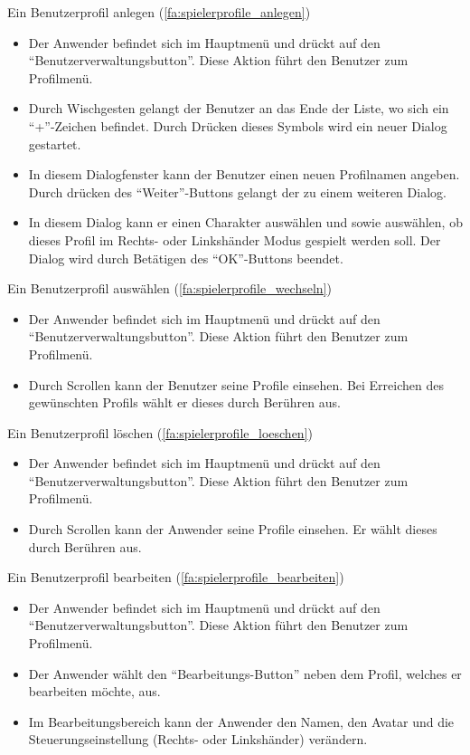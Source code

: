 \documentclass{scrartcl}
\begin{document}
\begin{telist}
	\item Ein Benutzerprofil anlegen (\ref{fa:spielerprofile_anlegen})
	\begin{itemize}
		\item Der Anwender befindet sich im Hauptmenü und drückt auf den \enquote{Benutzerverwaltungsbutton}. Diese Aktion führt den Benutzer zum Profilmenü.
		\item Durch Wischgesten gelangt der Benutzer an das Ende der Liste, wo sich ein \enquote{+}-Zeichen befindet. Durch Drücken dieses Symbols wird ein neuer Dialog gestartet.
		\item In diesem Dialogfenster kann der Benutzer einen neuen Profilnamen angeben. Durch drücken des \enquote{Weiter}-Buttons gelangt der zu einem weiteren Dialog.
		\item In diesem Dialog kann er einen Charakter auswählen und sowie auswählen, ob dieses Profil im Rechts- oder Linkshänder Modus gespielt werden soll. Der Dialog wird durch Betätigen des \enquote{OK}-Buttons beendet.
	\end{itemize}
	
	\item Ein Benutzerprofil auswählen (\ref{fa:spielerprofile_wechseln})
	\begin{itemize}
		\item Der Anwender befindet sich im Hauptmenü und drückt auf den \enquote{Benutzerverwaltungsbutton}. Diese Aktion führt den Benutzer zum Profilmenü.
		\item Durch Scrollen kann der Benutzer seine Profile einsehen. Bei Erreichen des gewünschten Profils wählt er dieses durch Berühren aus.
	\end{itemize}
	
	\item Ein Benutzerprofil löschen (\ref{fa:spielerprofile_loeschen})
	\begin{itemize}
		\item Der Anwender befindet sich im Hauptmenü und drückt auf den \enquote{Benutzerverwaltungsbutton}. Diese Aktion führt den Benutzer zum Profilmenü.
		\item Durch Scrollen kann der Anwender seine Profile einsehen. Er wählt dieses durch Berühren aus. 
	\end{itemize}
	
	\item Ein Benutzerprofil bearbeiten (\ref{fa:spielerprofile_bearbeiten})
	\begin{itemize}
		\item Der Anwender befindet sich im Hauptmenü und drückt auf den \enquote{Benutzerverwaltungsbutton}. Diese Aktion führt den Benutzer zum Profilmenü.
		\item Der Anwender wählt den \enquote{Bearbeitungs-Button} neben dem Profil, welches er bearbeiten möchte, aus.
		\item Im Bearbeitungsbereich kann der Anwender den Namen, den Avatar und die Steuerungseinstellung (Rechts- oder Linkshänder) verändern.
	\end{itemize}
	

\end{telist}
\end{document}
